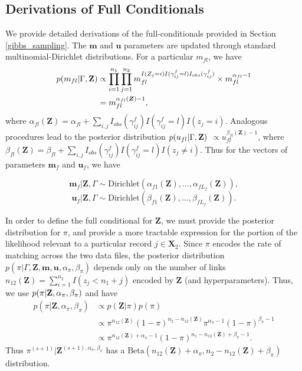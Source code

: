 \documentclass[ba]{imsart}
\begin{document}
	\hypertarget{app:derivations}{%
	\subsection{Derivations of Full Conditionals}\label{app:derivations}}

We provide detailed derivations of the full-conditionals provided in Section \ref{gibbs_sampling}. The $\bm{m}$ and $\bm{u}$ parameters are updated through standard multinomial-Dirichlet distributions. For a particular $m_{fl}$, we have
\begin{align*}
	p(m_{fl}| \Gamma, \bf{Z}) &\propto \prod_{i=1}^{n_1} \prod_{j=1}^{n_2} m_{fl}^{I(Z_j = i) I(\gamma_{ij}^f = l) I_{obs}(\gamma_{ij}^f)} \times  m_{fl}^{\alpha_{fl} - 1} \\
	&= m_{fl}^{\alpha_{fl}(\bm{Z}) - 1},
\end{align*}
where $\alpha_{fl}(\bm{Z})= \alpha_{fl} + \sum_{i,j} I_{obs}(\gamma_{ij}^f)I(\gamma_{ij}^f = l) I(z_j = i)$. Analogous procedures lead to the posterior distribution $p(u_{fl}| \Gamma, \bf{Z})$  $\propto u_{fl}^{\beta_{fl}(\bm{Z}) - 1}$, where $\beta_{fl}(\bm{Z})= \beta_{fl} + \sum_{i,j} I_{obs}(\gamma_{ij}^f)I(\gamma_{ij}^f = l) I(z_j \neq i)$. Thus for the vectors of parameters $\bm{m}_f$ and $\bm{u}_f$, we have

$$\bm{m}_f|\bm{Z}, \Gamma \sim \text{Dirichlet}(\alpha_{f1}(\bm{Z}), \ldots, \alpha_{fL_f}(\bm{Z})),$$
$$\bm{u}_f|\bm{Z}, \Gamma \sim \text{Dirichlet}(\beta_{f1}(\bm{Z}), \ldots, \beta_{fL_f}(\bm{Z})).$$

In order to define the full conditional for $\bm{Z}$, we must provide the posterior distribution for $\pi$, and provide a more tractable expression for the portion of the likelihood relevant to a particular record $j \in \bm{X}_2$. Since $\pi$ encodes the rate of matching across the two data files, the posterior distribution $p(\pi|\Gamma, \bm{Z}, \bm{m}, \bm{u}, \alpha_{\pi}, \beta_{\pi})$ depends only on the number of links $n_{12}(\bm{Z}) = \sum_{i=1}^{n_2}I(z_j < n_1 + j)$ encoded by $\bm{Z}$ (and hyperparameters). Thus, we use $p(\pi | \bf{Z}, \alpha_{\pi}, \beta_{\pi})$ and have 
\begin{align*}
	p(\pi | \bm{Z}, \alpha_{\pi}, \beta_{\pi}) &\propto p(\bm{Z}|\pi)p(\pi) \\
	&\propto \pi^{n_{12}(\bm{Z})} (1-\pi)^{n_2 - n_{12}(\bm{Z})} \pi^{\alpha_{\pi} -1} (1-\pi)^{\beta_{\pi} -1} \\
	&\propto \pi^{n_{12}(\bm{Z}) + \alpha_{\pi} - 1} (1-\pi)^{n_1 - n_{12}(\bm{Z}) + \beta_{\pi} -1}.
\end{align*}
Thus $\pi^{(s+1)}|\bm{Z}^{(s+1),  \alpha_{\pi}, \beta_{\pi}}$ has a $\text{Beta}(n_{12}(\bm{Z}) + \alpha_{\pi}, n_2 - n_{12}(\bm{Z}) + \beta_{\pi})$ distribution.
\end{document}
